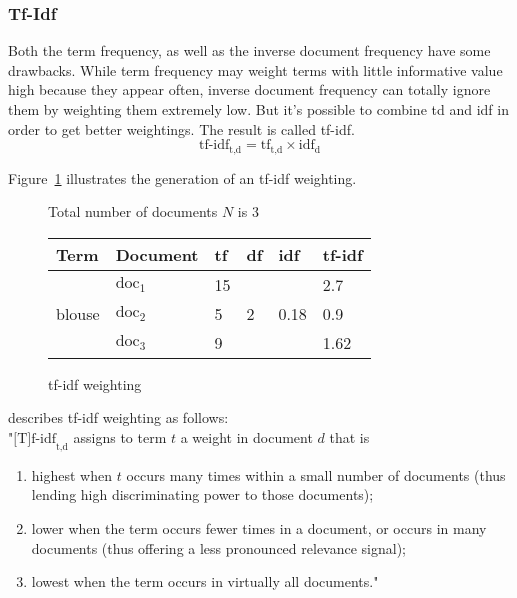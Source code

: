 \subsubsection{Tf-Idf}
\label{sec:tfidf}
Both the term frequency, as well as the inverse document frequency have some drawbacks.
While term frequency may weight terms with little informative value high because they appear often, inverse document frequency can totally ignore them by weighting them extremely low.
But it's possible to combine td and idf in order to get better weightings.
The result is called tf-idf.\citep[p.~118-119]{manning:2009}
\begin{equation}
    \text{tf-idf}_{\text{t,d}} = \text{tf}_\text{t,d} \times \text{idf}_\text{d}
\end{equation}

\noindent
Figure~\ref{fig:tfidfweighting} illustrates the generation of an tf-idf weighting.
\begin{figure}[h]

    Total number of documents $N$ is 3\\

    \center
    \begin{tabular}{ l l | l l l l }
        \rowcolor{\dustRowColourHead}
        Term                    & Document          & tf    & df& idf   & tf-idf\\\hline
        \multirow{3}{*}{blouse} & $\text{doc}_1$    & 15    &  \multirow{3}{*}{2}   & \multirow{3}{*}{0.18}     & 2.7\\
                                & $\text{doc}_2$    & 5     &                       &                           & 0.9\\
                                & $\text{doc}_3$    & 9     &                       &                           & 1.62\\
    \end{tabular}
    \caption{tf-idf weighting}
    \label{fig:tfidfweighting}
\end{figure}

\noindent
\citeauthor{manning:2009} describes tf-idf weighting as follows:\\
"$\text{[T]f-idf}_{\text{t,d}}$ assigns to term $t$ a weight in document $d$ that is
\begin{enumerate}
    \item highest when $t$ occurs many times within a small number of documents
    (thus lending high discriminating power to those documents);
    \item lower when the term occurs fewer times in a document, or occurs in many
    documents (thus offering a less pronounced relevance signal);
    \item lowest when the term occurs in virtually all documents."
\end{enumerate}
\citep[p.~119]{manning:2009}

